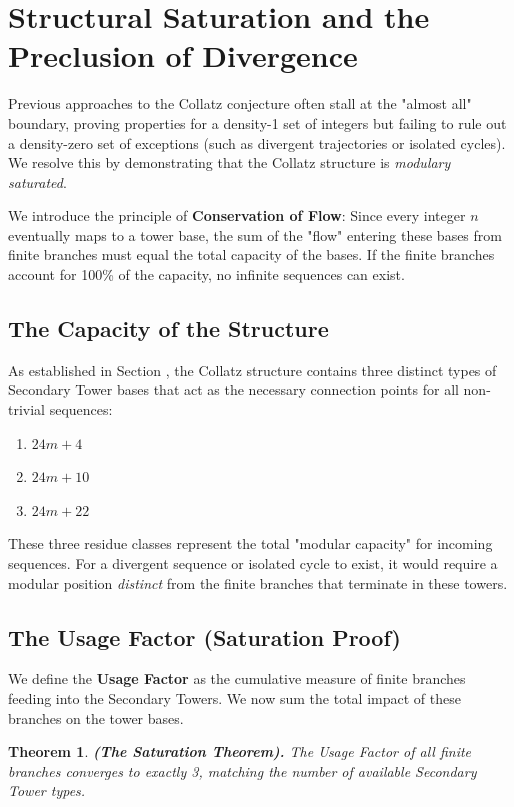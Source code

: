 \documentclass[sn-mathphys-num, pdflatex]{sn-jnl}
\newtheorem{theorem}{Theorem}[section]
\begin{document}
\section{Structural Saturation and the Preclusion of Divergence}\label{sec7}

Previous approaches to the Collatz conjecture often stall at the "almost all" boundary, proving properties for a density-1 set of integers but failing to rule out a density-zero set of exceptions (such as divergent trajectories or isolated cycles). We resolve this by demonstrating that the Collatz structure is \textit{modulary saturated}.

We introduce the principle of \textbf{Conservation of Flow}: Since every integer $n$ eventually maps to a tower base, the sum of the "flow" entering these bases from finite branches must equal the total capacity of the bases. If the finite branches account for 100\% of the capacity, no infinite sequences can exist.

\subsection{The Capacity of the Structure}
As established in Section , the Collatz structure contains three distinct types of Secondary Tower bases that act as the necessary connection points for all non-trivial sequences:
\begin{enumerate}
    \item $24m+4$
    \item $24m+10$
    \item $24m+22$
\end{enumerate}
These three residue classes represent the total "modular capacity" for incoming sequences. For a divergent sequence or isolated cycle to exist, it would require a modular position \textit{distinct} from the finite branches that terminate in these towers.

\subsection{The Usage Factor (Saturation Proof)}
We define the \textbf{Usage Factor} as the cumulative measure of finite branches feeding into the Secondary Towers. We now sum the total impact of these branches on the tower bases.

\begin{theorem}
\label{thm:saturation}
\textbf{(The Saturation Theorem).} The Usage Factor of all finite branches converges to exactly 3, matching the number of available Secondary Tower types.
\end{theorem}
\end{document}
